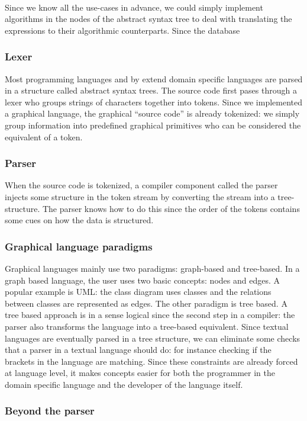 \paragraph{}
Since we know all the use-cases in advance, we could simply implement
algorithms in the nodes of the abstract syntax tree to deal with translating
the expressions to their algorithmic counterparts. Since the database
\subsubsection{Lexer}
Most programming languages and by extend domain specific languages are parsed
in a structure called abstract syntax trees. The source code first pases
through a lexer who groups strings of characters together into tokens. Since we
implemented a graphical language, the graphical ``source code'' is already
tokenized: we simply group information into predefined graphical primitives who
can be considered the equivalent of a token.
\subsubsection{Parser}
When the source code is tokenized, a compiler component called the parser
injects some structure in the token stream by converting the stream into a
tree-structure. The parser knows how to do this since the order of the tokens
contains some cues on how the data is structured.
\subsubsection{Graphical language paradigms}
Graphical languages mainly use two paradigms: graph-based and tree-based. In a
graph based language, the user uses two basic concepts: nodes and edges. A
popular example is UML: the class diagram uses classes and the relations
between classes are represented as edges. The other paradigm is tree based. A
tree based approach is in a sense logical since the second step in a compiler:
the parser also transforms the language into a tree-based equivalent. Since
textual languages are eventually parsed in a tree structure, we can eliminate
some checks that a parser in a textual language should do: for instance
checking if the brackets in the language are matching. Since these constraints
are already forced at language level, it makes concepts easier for both the
programmer in the domain specific language and the developer of the language
itself.
\subsubsection{Beyond the parser}
